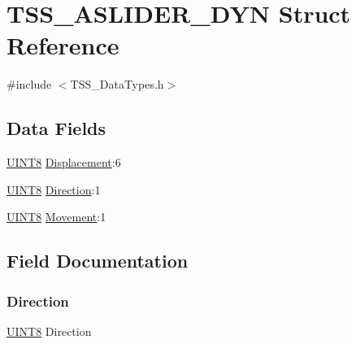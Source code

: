 \hypertarget{struct_t_s_s___a_s_l_i_d_e_r___d_y_n}{}\section{T\+S\+S\+\_\+\+A\+S\+L\+I\+D\+E\+R\+\_\+\+D\+YN Struct Reference}
\label{struct_t_s_s___a_s_l_i_d_e_r___d_y_n}


{\ttfamily \#include $<$T\+S\+S\+\_\+\+Data\+Types.\+h$>$}

\subsection*{Data Fields}
\begin{DoxyCompactItemize}
\item 
\hyperlink{_t_s_s___data_types_8h_ab27e9918b538ce9d8ca692479b375b6a}{U\+I\+N\+T8} \hyperlink{struct_t_s_s___a_s_l_i_d_e_r___d_y_n_aeade839b12fc17a00b9836bf422184c6}{Displacement}\+:6
\item 
\hyperlink{_t_s_s___data_types_8h_ab27e9918b538ce9d8ca692479b375b6a}{U\+I\+N\+T8} \hyperlink{struct_t_s_s___a_s_l_i_d_e_r___d_y_n_acf57d62841f58ca6bd206db2fc733fc0}{Direction}\+:1
\item 
\hyperlink{_t_s_s___data_types_8h_ab27e9918b538ce9d8ca692479b375b6a}{U\+I\+N\+T8} \hyperlink{struct_t_s_s___a_s_l_i_d_e_r___d_y_n_aa5fac4f9f3ed46d5688c0b547f0b757e}{Movement}\+:1
\end{DoxyCompactItemize}


\subsection{Field Documentation}
\mbox{\label{struct_t_s_s___a_s_l_i_d_e_r___d_y_n_acf57d62841f58ca6bd206db2fc733fc0}} 
\subsubsection{\texorpdfstring{Direction}{Direction}}
{\footnotesize\ttfamily \hyperlink{_t_s_s___data_types_8h_ab27e9918b538ce9d8ca692479b375b6a}{U\+I\+N\+T8} Direction}

